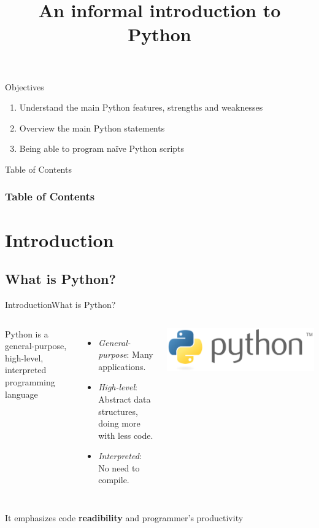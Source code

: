 \documentclass[10pt,compress]{beamer} %
\title[An informal introduction to Python]{An informal introduction to Python}
\author{}
\institute{\asignatura}
\date{}
\begin{document}
{\titlepageBlue
    \begin{frame}
        \titlepage
    \end{frame}
}

\begin{frame}[plain]{}
	\begin{block}{Objectives}
		\begin{enumerate}
		\item Understand the main Python features, strengths and weaknesses
		\item Overview the main Python statements
		\item Being able to program na\"ive Python scripts
		\end{enumerate}
	\end{block}
\end{frame}

{
\eliminarNavegacion
\begin{frame}[shrink]{Table of Contents}
 \frametitle{Table of Contents}
 \tableofcontents
\end{frame}
}

\section{Introduction}
\subsection{What is Python?}

\begin{frame}{Introduction}{What is Python?}
    \begin{columns}
			Python is a general-purpose, high-level, interpreted programming language
				\begin{itemize}
				\item \textit{General-purpose}: Many applications.
				\item \textit{High-level}: Abstract data structures, doing more with less code.
				\item \textit{Interpreted}: No need to compile.
				\end{itemize}

		\centering \hspace{-2cm} \includegraphics[width=1.8\linewidth]{figs/python.png}
	\end{columns}
	\bigskip
			It emphasizes code \textbf{readibility} and programmer's productivity\\
\end{frame}
\end{document}
